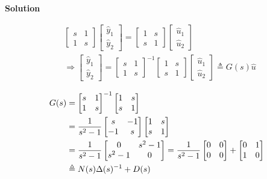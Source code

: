 \documentclass[12pt,a4paper]{article}
\begin{document}
\textbf{Solution}

\begin{align*}
	&\begin{bmatrix}
		s & 1 \\
		1 & s
	\end{bmatrix} \begin{bmatrix}
	\hat y_1 \\ \hat y_2
	\end{bmatrix} = \begin{bmatrix}
	1 & s \\
	s & 1
	\end{bmatrix} \begin{bmatrix}
	\hat u_1 \\ \hat u_2
	\end{bmatrix} \\
	&\Rightarrow \begin{bmatrix}
		\hat y_1 \\ \hat y_2
	\end{bmatrix} = \begin{bmatrix}
			s & 1 \\
	1 & s
	\end{bmatrix}^{-1} \begin{bmatrix}
	1 & s \\
	s & 1
	\end{bmatrix} \begin{bmatrix}
	\hat u_1 \\ \hat u_2 
	\end{bmatrix}\triangleq G(s) \hat u
\end{align*}

\begin{align*}
	G(s) &=  \begin{bmatrix}
		s & 1 \\
		1 & s
	\end{bmatrix}^{-1} \begin{bmatrix}
		1 & s \\
		s & 1
	\end{bmatrix} \\
	&= {1\over s^2 -1 } \begin{bmatrix}
		s & -1 \\
		-1 & s 
	\end{bmatrix} \begin{bmatrix}
	1 & s \\ s & 1
	\end{bmatrix} \\
	&= {1\over s^2 - 1} \begin{bmatrix}
		0 & s^2 -1 \\
		s^2 -1 & 0
	\end{bmatrix} = {1\over s^2 - 1}\begin{bmatrix}
	0 & 0 \\ 0 & 0
	\end{bmatrix}  + \begin{bmatrix}
	0 & 1 \\ 1 & 0 
	\end{bmatrix}\\
	&\triangleq N(s) \Delta(s)^{-1} + D(s)
\end{align*}
\end{document}

